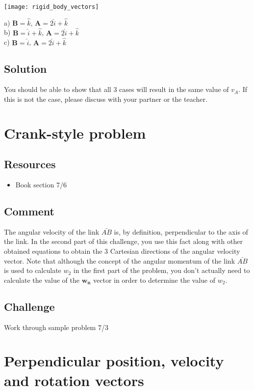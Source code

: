 \texttt{[image: rigid\_body\_vectors]}

a) $\bm{B} = \hat{k}$,              $\bm{A} = 2 \hat{i} + \hat{k}$\\
b) $\bm{B} = \hat{i} + \hat{k}$,    $\bm{A} = 2 \hat{i} + \hat{k}$\\
c) $\bm{B} = \hat{i}$,              $\bm{A} = 2 \hat{i} + \hat{k}$

\subsection*{Solution}
You should be able to show that all 3 cases will result in the same value of $v_A$. If this is not the case, please discuss with your partner or the teacher.




\newpage
\section{Crank-style problem}

\subsection*{Resources}
\begin{itemize}
    \item Book section 7/6
\end{itemize}

\subsection*{Comment}
The angular velocity of the link $\bar{AB}$ is, by definition, perpendicular to the axis of the link. In the second part of this challenge, you use this fact along with other obtained equations to obtain the 3 Cartesian directions of the angular velocity vector. Note that although the concept of the angular momentum of the link $\bar{AB}$ is used to calculate $w_2$ in the first part of the problem, you don't actually need to calculate the value of the $\bm{w_n}$ vector in order to determine the value of $w_2$.

\subsection*{Challenge}
Work through sample problem 7/3




\newpage
\section{Perpendicular position, velocity and rotation vectors}

